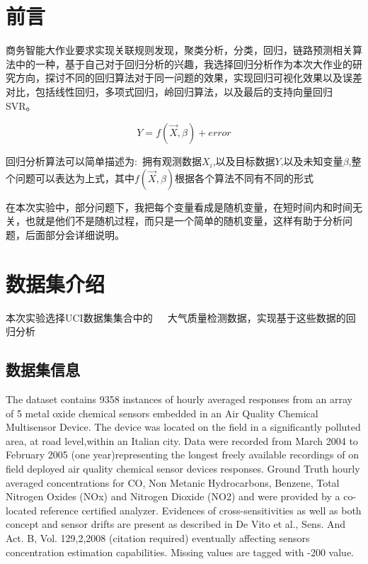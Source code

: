 \documentclass{ctexart}
\begin{document}
\tableofcontents
\section*{前言} %

商务智能大作业要求实现关联规则发现，聚类分析，分类，回归，链路预测相关算法中的一种，基于自己对于回归分析的兴趣，我选择回归分析作为本次大作业的研究方向，探讨不同的回归算法对于同一问题的效果，实现回归可视化效果以及误差对比，包括线性回归，多项式回归，岭回归算法，以及最后的支持向量回归SVR。

\begin{equation}
	Y = f(\vec{X}, \beta) + error
\end{equation}

回归分析算法可以简单描述为:\ 拥有观测数据$X_{i}$,以及目标数据$Y$,以及未知变量$\beta$,整个问题可以表达为上式，其中$f(\vec{X}, \beta)$根据各个算法不同有不同的形式

\begin{info} %
	在本次实验中，部分问题下，我把每个变量看成是随机变量，在短时间内和时间无关，也就是他们不是随机过程，而只是一个简单的随机变量，这样有助于分析问题，后面部分会详细说明。
\end{info}



\section{数据集介绍} %

本次实验选择UCI数据集集合中的\ \ \ 大气质量检测数据，实现基于这些数据的回归分析


\subsection{数据集信息}
The dataset contains 9358 instances of hourly averaged responses from an array of 5 metal oxide chemical sensors embedded in an Air Quality Chemical Multisensor Device. The device was located on the field in a significantly polluted area, at road level,within an Italian city. Data were recorded from March 2004 to February 2005 (one year)representing the longest freely available recordings of on field deployed air quality chemical sensor devices responses. Ground Truth hourly averaged concentrations for CO, Non Metanic Hydrocarbons, Benzene, Total Nitrogen Oxides (NOx) and Nitrogen Dioxide (NO2) and were provided by a co-located reference certified analyzer. Evidences of cross-sensitivities as well as both concept and sensor drifts are present as described in De Vito et al., Sens. And Act. B, Vol. 129,2,2008 (citation required) eventually affecting sensors concentration estimation capabilities. Missing values are tagged with -200 value. 
\end{document}
